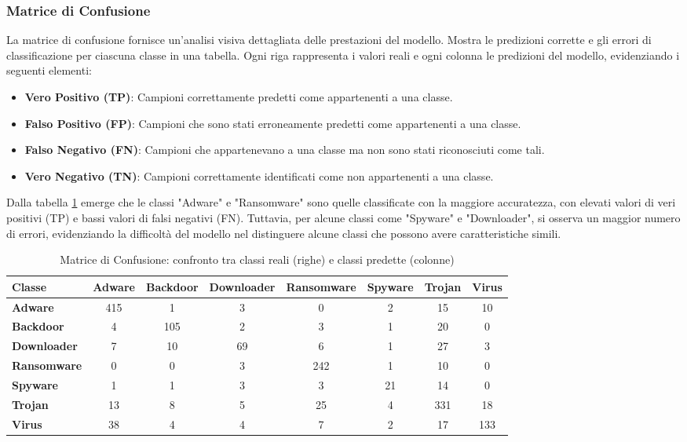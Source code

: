     

\subsubsection{Matrice di Confusione}
La matrice di confusione fornisce un'analisi visiva dettagliata delle prestazioni del modello. Mostra le predizioni corrette e gli errori di classificazione per ciascuna classe in una tabella. Ogni riga rappresenta i valori reali e ogni colonna le predizioni del modello, evidenziando i seguenti elementi:
\begin{itemize}
    \item \textbf{Vero Positivo (TP)}: Campioni correttamente predetti come appartenenti a una classe.
    \item \textbf{Falso Positivo (FP)}: Campioni che sono stati erroneamente predetti come appartenenti a una classe.
    \item \textbf{Falso Negativo (FN)}: Campioni che appartenevano a una classe ma non sono stati riconosciuti come tali.
    \item \textbf{Vero Negativo (TN)}: Campioni correttamente identificati come non appartenenti a una classe.
\end{itemize}

Dalla tabella \ref{tab:confusion_matrix} emerge che le classi "Adware" e "Ransomware" sono quelle classificate con la maggiore accuratezza, con elevati valori di veri positivi (TP) e bassi valori di falsi negativi (FN). Tuttavia, per alcune classi come "Spyware" e "Downloader", si osserva un maggior numero di errori, evidenziando la difficoltà del modello nel distinguere alcune classi che possono avere caratteristiche simili.
\begin{table}[ht]
    \centering
    \hspace*{-2cm} 
    \begin{tabular}{@{}|l|c|c|c|c|c|c|c|@{}}
    \toprule
    \textbf{Classe}      & \textbf{Adware} & \textbf{Backdoor} & \textbf{Downloader} & \textbf{Ransomware} & \textbf{Spyware} & \textbf{Trojan} & \textbf{Virus} \\ \midrule
    \textbf{Adware}      & 415 & 1   & 3   & 0   & 2   & 15  & 10  \\\midrule
    \textbf{Backdoor}    & 4   & 105 & 2   & 3   & 1   & 20  & 0   \\\midrule
    \textbf{Downloader}  & 7   & 10  & 69  & 6   & 1   & 27  & 3   \\\midrule
    \textbf{Ransomware}  & 0   & 0   & 3   & 242 & 1   & 10  & 0   \\\midrule
    \textbf{Spyware}     & 1   & 1   & 3   & 3   & 21  & 14  & 0   \\\midrule
    \textbf{Trojan}      & 13  & 8   & 5   & 25  & 4   & 331 & 18  \\\midrule
    \textbf{Virus}       & 38  & 4   & 4   & 7   & 2   & 17  & 133 \\ \bottomrule
    \end{tabular}
    \vspace{.2cm}
    \caption{Matrice di Confusione: confronto tra classi reali (righe) e classi predette (colonne)}
    \label{tab:confusion_matrix}
\end{table}
    
